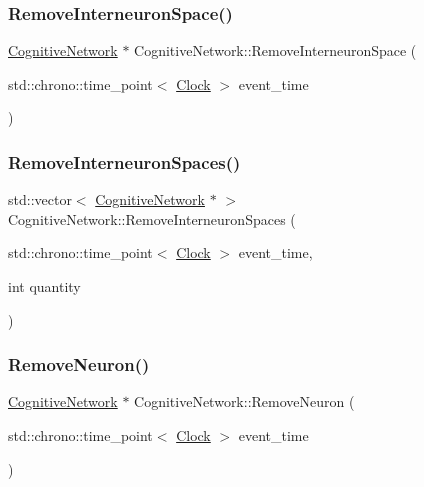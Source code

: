 \mbox{\label{classCognitiveNetwork_a04e38cea356f1c7ac31c4df5e19d759c}} 
\subsubsection{\texorpdfstring{Remove\+Interneuron\+Space()}{RemoveInterneuronSpace()}}
{\footnotesize\ttfamily \mbox{\hyperlink{classCognitiveNetwork}{Cognitive\+Network}} $\ast$ Cognitive\+Network\+::\+Remove\+Interneuron\+Space (\begin{DoxyParamCaption}\item[{std\+::chrono\+::time\+\_\+point$<$ \mbox{\hyperlink{universe_8h_a0ef8d951d1ca5ab3cfaf7ab4c7a6fd80}{Clock}} $>$}]{event\+\_\+time }\end{DoxyParamCaption})}

\mbox{\label{classCognitiveNetwork_a994c5f93447a82429809c89aa08d3dc1}} 
\subsubsection{\texorpdfstring{Remove\+Interneuron\+Spaces()}{RemoveInterneuronSpaces()}}
{\footnotesize\ttfamily std\+::vector$<$ \mbox{\hyperlink{classCognitiveNetwork}{Cognitive\+Network}} $\ast$ $>$ Cognitive\+Network\+::\+Remove\+Interneuron\+Spaces (\begin{DoxyParamCaption}\item[{std\+::chrono\+::time\+\_\+point$<$ \mbox{\hyperlink{universe_8h_a0ef8d951d1ca5ab3cfaf7ab4c7a6fd80}{Clock}} $>$}]{event\+\_\+time,  }\item[{int}]{quantity }\end{DoxyParamCaption})}

\mbox{\label{classCognitiveNetwork_a33e911ec87d902a8fd8bb6d9e23c4261}} 
\subsubsection{\texorpdfstring{Remove\+Neuron()}{RemoveNeuron()}}
{\footnotesize\ttfamily \mbox{\hyperlink{classCognitiveNetwork}{Cognitive\+Network}} $\ast$ Cognitive\+Network\+::\+Remove\+Neuron (\begin{DoxyParamCaption}\item[{std\+::chrono\+::time\+\_\+point$<$ \mbox{\hyperlink{universe_8h_a0ef8d951d1ca5ab3cfaf7ab4c7a6fd80}{Clock}} $>$}]{event\+\_\+time }\end{DoxyParamCaption})}

